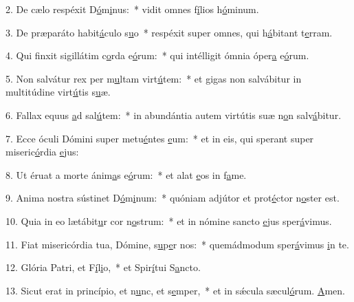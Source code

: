 2. De cælo respéxit D\uline{ó}m\uline{i}nus:~* vidit omnes f\uline{í}lios h\uline{ó}minum.\par 
3. De præparáto habit\uline{á}culo s\uline{u}o~* respéxit super omnes, qui h\uline{á}bitant t\uline{e}rram.\par 
4. Qui finxit sigillátim c\uline{o}rda e\uline{ó}rum:~* qui intélligit ómnia óper\uline{a} e\uline{ó}rum.\par 
5. Non salvátur rex per m\uline{u}ltam virt\uline{ú}tem:~* et gigas non salvábitur in multitúdine virt\uline{ú}tis s\uline{u}æ.\par 
6. Fallax equus \uline{a}d sal\uline{ú}tem:~* in abundántia autem virtútis suæ n\uline{o}n salv\uline{á}bitur.\par 
7. Ecce óculi Dómini super metu\uline{é}ntes \uline{e}um:~* et in eis, qui sperant super miseric\uline{ó}rdia \uline{e}jus:\par 
8. Ut éruat a morte ánim\uline{a}s e\uline{ó}rum:~* et alat \uline{e}os in f\uline{a}me.\par 
9. Anima nostra sústinet D\uline{ó}m\uline{i}num:~* quóniam adjútor et prot\uline{é}ctor n\uline{o}ster est.\par 
10. Quia in eo lætábit\uline{u}r cor n\uline{o}strum:~* et in nómine sancto \uline{e}jus sper\uline{á}vimus.\par 
11. Fiat misericórdia tua, Dómine, s\uline{u}p\uline{e}r nos:~* quemádmodum sper\uline{á}vimus \uline{i}n te.\par 
12. Glória Patri, et F\uline{í}l\uline{i}o,~* et Spir\uline{í}tui S\uline{a}ncto.\par 
13. Sicut erat in princípio, et n\uline{u}nc, et s\uline{e}mper,~* et in sǽcula sæcul\uline{ó}rum. \uline{A}men.\par 
